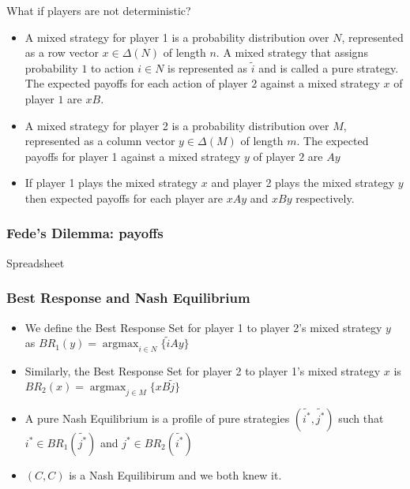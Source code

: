 \documentclass[pdf]{beamer}
\newcommand{\pstrat}{\widetilde}
\DeclareMathOperator*{\argmax}{argmax}
\begin{document}
\begin{frame}
    What if players are not deterministic?
    \begin{itemize}
        \item A mixed strategy for player 1 is a probability distribution over $N$, represented as a row vector $x \in \Delta(N)$ of length $n$. A mixed strategy that assigns probability $1$ to action $i \in N$ is represented as $\pstrat{i}$ and is called a pure strategy. The expected payoffs for each action of player 2 against a mixed strategy $x$ of player $1$ are $xB$.
        \pause
        \item A mixed strategy for player 2 is a probability distribution over $M$, represented as a column vector $y \in \Delta(M)$ of length $m$. The expected payoffs for player 1 against a mixed strategy $y$ of player $2$ are  $Ay$
        \pause
        \item If player 1 plays the mixed strategy $x$ and player 2 plays the mixed strategy $y$ then expected payoffs for each player are $xAy$ and $xBy$ respectively. 
    \end{itemize}
\end{frame}

\begin{frame}
    \frametitle{Fede's Dilemma: payoffs}
    
    Spreadsheet


\end{frame}

\begin{frame}
    \frametitle{Best Response and Nash Equilibrium}

    \begin{itemize}
        \item We define the Best Response Set for player 1 to player 2's mixed strategy $y$ as $BR_1(y) = \argmax_{i \in N}\{ \pstrat{i}Ay\}$
        \pause
        \item Similarly, the Best Response Set for player 2 to player 1's mixed strategy $x$ is $BR_2(x) = \argmax_{j \in M}\{ xB\pstrat{j}\}$
        \pause
        \item A pure Nash Equilibrium is a profile of pure strategies $(\pstrat{i^*}, \pstrat{j^*})$ such that $i^* \in BR_1(\pstrat{j^*})$ and $j^* \in BR_2(\pstrat{i^*})$
        \item \pause $(C, C)$ is a Nash Equilibirum and we both knew it.
    \end{itemize}
\end{frame}
\end{document}
